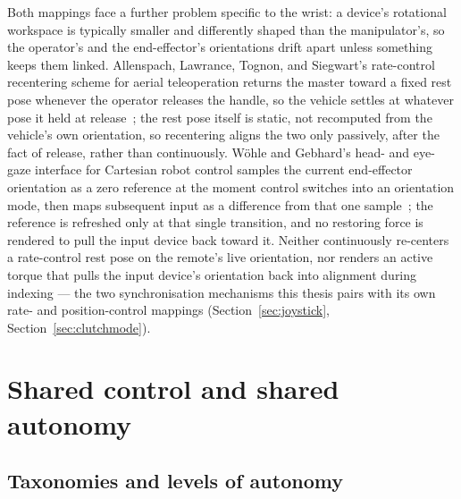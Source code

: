 \documentclass[12pt,a4paper,twoside,openright]{report}
\begin{document}
Both mappings face a further problem specific to the wrist: a device's rotational workspace is typically smaller and differently shaped than the manipulator's, so the operator's and the end-effector's orientations drift apart unless something keeps them linked. Allenspach, Lawrance, Tognon, and Siegwart's rate-control recentering scheme for aerial teleoperation returns the master toward a fixed rest pose whenever the operator releases the handle, so the vehicle settles at whatever pose it held at release~\cite{allenspach2022bilateral}; the rest pose itself is static, not recomputed from the vehicle's own orientation, so recentering aligns the two only passively, after the fact of release, rather than continuously. W\"ohle and Gebhard's head- and eye-gaze interface for Cartesian robot control samples the current end-effector orientation as a zero reference at the moment control switches into an orientation mode, then maps subsequent input as a difference from that one sample~\cite{wohle2021gaze}; the reference is refreshed only at that single transition, and no restoring force is rendered to pull the input device back toward it. Neither continuously re-centers a rate-control rest pose on the remote's live orientation, nor renders an active torque that pulls the input device's orientation back into alignment during indexing --- the two synchronisation mechanisms this thesis pairs with its own rate- and position-control mappings (Section~\ref{sec:joystick}, Section~\ref{sec:clutchmode}).

\section{Shared control and shared autonomy}
\label{sec:sota-shared-control}

\subsection{Taxonomies and levels of autonomy}
\label{sec:sota-taxonomies}
\end{document}
